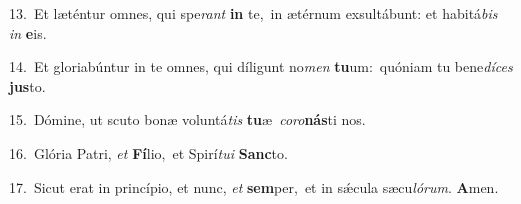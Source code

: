 {\numbfont\textcolor{\numbcolor}{13.}}~Et læténtur omnes, qui spe\textit{rant} \textbf{in} te,~\star in ætérnum exsultábunt: et habitá\textit{bis} \textit{in} \textbf{e}\-is.\par
{\numbfont\textcolor{\numbcolor}{14.}}~Et gloriabúntur in te omnes, qui díligunt no\textit{men} \textbf{tu}\-um:~\star quóniam tu bene\-\textit{dí}\-\textit{ces} \textbf{jus}\-to.\par
{\numbfont\textcolor{\numbcolor}{15.}}~Dómine, ut scuto bonæ voluntá\textit{tis} \textbf{tu}\-æ~\star \textit{co}\-\textit{ro}\textbf{nás}ti nos.\par
{\numbfont\textcolor{\numbcolor}{16.}}~Glória Patri, \textit{et} \textbf{Fí}\-lio,~\star et Spirí\-\textit{tu}\-\textit{i} \textbf{Sanc}\-to.\par
{\numbfont\textcolor{\numbcolor}{17.}}~Sicut erat in princípio, et nunc, \textit{et} \textbf{sem}\-per,~\star et in sǽcula sæcu\-\textit{ló}\-\textit{rum}. \textbf{A}\-men.\par
